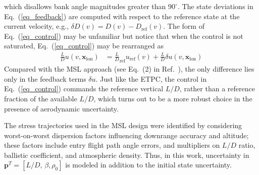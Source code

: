 \documentclass[journal ]{new-aiaa}
\newcommand{\state}{\ensuremath{\mathbf{x}}}
\newcommand{\ur}{\ensuremath{u_{\mathrm{ref}}}}
\newcommand{\param}{\ensuremath{\mathbf{p}}}
\begin{document}
which disallows bank angle magnitudes greater than $90^\circ$.
The state deviations in Eq.~(\ref{eq_feedback}) are computed with respect to the reference state at the current velocity, e.g., $\delta D(v) = D(v) - D_{\mathrm{ref}}(v)$.
The form of Eq.~(\ref{eq_control}) may be unfamiliar but notice that when the control is not saturated, Eq.~(\ref{eq_control}) may be rearranged as
\begin{align}
	\frac{L}{D}u(v,\state_{\mathrm{lon}}) &= \frac{L}{D}_{\mathrm{ref}}\ur(v) + \frac{L}{D}\delta u(v,\state_{\mathrm{lon}}) \label{eq_control_rearranged}
\end{align}
Compared with the MSL approach (see Eq.~(2) in Ref.~\cite{MSL_EDL2}), the only difference lies only in the feedback terms $\delta u$. Just like the ETPC, the control in Eq.~(\ref{eq_control}) commands the reference vertical $ L/D $, rather than a reference fraction of the available $ L/D $, which turns out to be a more robust choice in the presence of aerodynamic uncertainty.

The stress trajectories used in the MSL design were identified by considering worst-on-worst dispersion factors influencing downrange accuracy and altitude\cite{MSL_EDL2}; these factors include entry flight path angle errors, and multipliers on $L/D$ ratio, ballistic coefficient, and atmospheric density. Thus, in this work, uncertainty in $\param^T = [L/D,\,\beta,\rho_0]$ is modeled in addition to the initial state uncertainty. 
\end{document}
